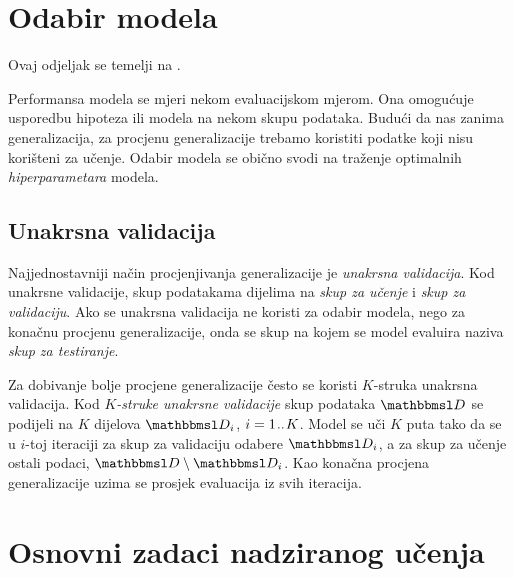 \documentclass[utf8, diplomski, lmodern]{fer}
\begin{document}
\section{Odabir modela} \label{sec:su-odabir-modela}

Ovaj odjeljak se temelji na \citet{Snajder:2014:SU}. 

Performansa modela se mjeri nekom evaluacijskom mjerom. Ona omogućuje usporedbu hipoteza ili modela na nekom skupu podataka. Budući da nas zanima generalizacija, za procjenu generalizacije trebamo koristiti podatke koji nisu korišteni za učenje. Odabir modela se obično svodi na traženje optimalnih \emph{hiperparametara} modela.

\subsection{Unakrsna validacija}

Najjednostavniji način procjenjivanja generalizacije je \emph{unakrsna validacija}. Kod unakrsne validacije, skup podatakama dijelima na \emph{skup za učenje} i \emph{skup za validaciju}. Ako se unakrsna validacija ne koristi za odabir modela, nego za konačnu procjenu generalizacije, onda se skup na kojem se model evaluira naziva \emph{skup za testiranje}.

Za dobivanje bolje procjene generalizacije često se koristi $K$-struka unakrsna validacija. Kod \emph{$K$-struke unakrsne validacije} skup podataka $\set D$ se podijeli na $K$ dijelova $\set D_i$, $i=1\mkern1.5mu{..}\mkern1.5mu K$. Model se uči $K$ puta tako da se u $i$-toj iteraciji za skup za validaciju odabere $\set D_i$, a za skup za učenje ostali podaci, $\set D\setminus\set D_i$. Kao konačna procjena generalizacije uzima se prosjek evaluacija iz svih iteracija.


\section{Osnovni zadaci nadziranog učenja}
\end{document}
